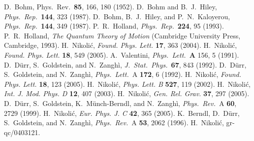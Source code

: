 \documentclass[12pt]{article} %
\begin{document}
\begin{thebibliography}{99}

D.~Bohm, Phys.~Rev.~{\bf 85}, 166, 180 (1952).
D.~Bohm and B.~J.~Hiley,
{\it Phys.~Rep.}~{\bf 144}, 323 (1987).
D.~Bohm, B.~J.~Hiley, and P.~N.~Kaloyerou,
{\it Phys.~Rep.}~{\bf 144}, 349 (1987).
P.~R.~Holland, {\it Phys.~Rep.}~{\bf 224}, 95 (1993).
P.~R.~Holland, {\it The Quantum Theory of Motion}
(Cambridge University Press, Cambridge, 1993).
H.~Nikoli\'c, {\it Found. Phys. Lett.} {\bf 17}, 363 (2004).
H.~Nikoli\'c, {\it Found. Phys. Lett.} {\bf 18}, 549 (2005).
A.~Valentini, {\it Phys.~Lett.}~{\bf A} 156, 5 (1991).
D.~D\"urr, S.~Goldstein, and N.~Zangh\`i,
{\it J.~Stat.~Phys.}~{\bf 67}, 843 (1992).
D.~D\"urr, S.~Goldstein, and N.~Zangh\`i,
{\it Phys.~Lett.}~A {\bf 172}, 6 (1992).
H.~Nikoli\'c, {\it Found. Phys. Lett.} {\bf 18}, 123 (2005).
H.~Nikoli\'c, {\it Phys. Lett. B} {\bf 527}, 119 (2002).
H.~Nikoli\'c, {\it Int. J. Mod. Phys. D} {\bf 12}, 407 (2003).
H.~Nikoli\'c, {\it Gen. Rel. Grav.} {\bf 37}, 297 (2005).
D.~D\"urr, S.~Goldstein, K.~M\"unch-Berndl, and N.~Zangh\`i,
{\it Phys.~Rev.}~A {\bf 60}, 2729 (1999).
H.~Nikoli\'c, {\it Eur. Phys. J. C} {\bf 42}, 365 (2005).
K.~Berndl, D.~D\"urr, S.~Goldstein, and N.~Zangh\`i,
{\it Phys.~Rev.}~A {\bf 53}, 2062 (1996).
H.~Nikoli\'c, gr-qc/0403121.

\end{thebibliography}
\end{document}
